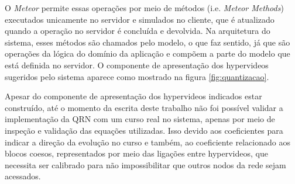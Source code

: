 O \textit{Meteor} permite essas operações por meio de métodos (i.e. \textit{Meteor Methods}) executados unicamente no servidor e simulados no cliente, que é atualizado quando a operação no servidor é concluída e devolvida. Na arquitetura do sistema, esses métodos são chamados pelo modelo, o que faz sentido, já que são operações da lógica do domínio da aplicação e compõem a parte do modelo que está definida no servidor. O componente de apresentação dos hypervideos sugeridos pelo sistema aparece como mostrado na figura \ref{fig:quantizacao}.

Apesar do componente de apresentação dos hypervideos indicados estar construído, até o momento da escrita deste trabalho não foi possível validar a implementação da QRN com um curso real no sistema, apenas por meio de inspeção e validação das equações utilizadas. Isso devido aos coeficientes para indicar a direção da evolução no curso e também, ao coeficiente relacionado aos blocos coesos, representados por meio das ligações entre hypervideos, que necessita ser calibrado para não impossibilitar que outros nodos da rede sejam acessados.